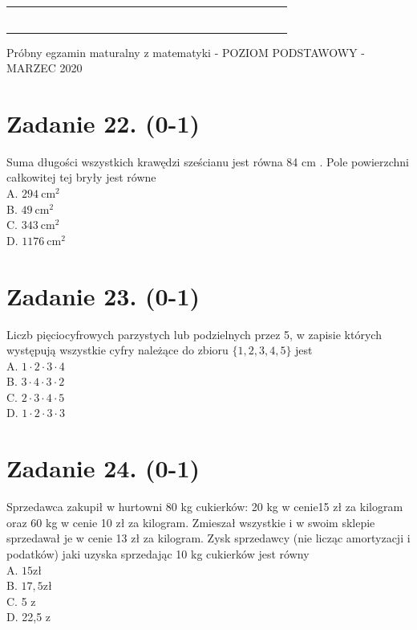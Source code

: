 \documentclass[10pt]{article}
\begin{document}
\begin{center}
\begin{tabular}{|c|c|c|c|c|c|c|c|c|c|c|c|c|c|c|c|c|c|c|c|c|c|c|c|c|}
 &  &  &  &  &  &  &  &  &  &  &  &  &  &  &  &  &  &  &  &  &  &  &  \\
\hline
 &  &  &  &  &  &  &  &  &  &  &  &  &  &  &  &  &  &  &  &  &  &  &  &  \\
\hline
 &  &  &  &  &  &  &  &  &  &  &  &  &  &  &  &  &  &  &  &  &  &  &  &  \\
\hline
 &  &  &  &  &  &  &  &  &  &  &  &  &  &  &  &  &  &  &  &  &  &  &  &  \\
\hline
 &  &  &  &  &  &  &  &  &  &  &  &  &  &  &  &  &  &  &  &  &  &  &  &  \\
\hline
 &  &  &  &  &  &  &  &  &  &  &  &  &  &  &  &  &  &  &  &  &  &  &  &  \\
\hline
 &  &  &  &  &  &  &  &  &  &  &  &  &  &  &  &  &  &  &  &  &  &  &  &  \\
\hline
\end{tabular}
\end{center}

Próbny egzamin maturalny z matematyki - POZIOM PODSTAWOWY - MARZEC 2020

\section*{Zadanie 22. (0-1)}
Suma długości wszystkich krawędzi sześcianu jest równa 84 cm . Pole powierzchni całkowitej tej bryły jest równe\\
A. \(294 \mathrm{~cm}^{2}\)\\
B. \(49 \mathrm{~cm}^{2}\)\\
C. \(343 \mathrm{~cm}^{2}\)\\
D. \(1176 \mathrm{~cm}^{2}\)

\section*{Zadanie 23. (0-1)}
Liczb pięciocyfrowych parzystych lub podzielnych przez 5, w zapisie których występują wszystkie cyfry należące do zbioru \(\{1,2,3,4,5\}\) jest\\
A. \(1 \cdot 2 \cdot 3 \cdot 4\)\\
B. \(3 \cdot 4 \cdot 3 \cdot 2\)\\
C. \(2 \cdot 3 \cdot 4 \cdot 5\)\\
D. \(1 \cdot 2 \cdot 3 \cdot 3\)

\section*{Zadanie 24. (0-1)}
Sprzedawca zakupił w hurtowni 80 kg cukierków: 20 kg w cenie15 zł za kilogram oraz 60 kg w cenie 10 zł za kilogram. Zmieszał wszystkie i w swoim sklepie sprzedawał je w cenie 13 zł za kilogram. Zysk sprzedawcy (nie licząc amortyzacji i podatków) jaki uzyska sprzedając 10 kg cukierków jest równy\\
A. \(15 \mathrm{zł}\)\\
B. \(17,5 \mathrm{zł}\)\\
C. 5 z\\
D. 22,5 z
\end{document}
